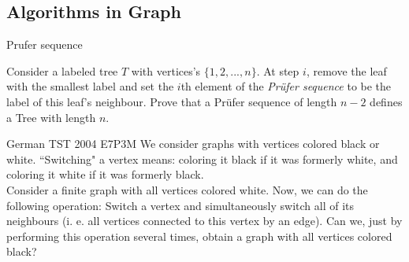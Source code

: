 \newpage
\subsection{Algorithms in Graph}


\begin{minipage}{.5\linewidth}
    \label{definition:cut_graph_theory}
\end{minipage}\hfill%
\begin{minipage}{.49\linewidth}
    \begin{figure}[H]
        \begin{center}
            \hspace{1em}
        \end{center}
    \end{figure}
\end{minipage}



\begin{minipage}{.55\linewidth}
    {Prufer sequence}{
        Consider a labeled tree $ T $ with vertices's $ \{1, 2, ..., n\} $. At
        step $ i $, remove the leaf with the smallest label and set the $ i $th
        element of the \textit{Prüfer sequence} to be the label of this leaf's
        neighbour. Prove that a Prüfer sequence of length $ n-2 $ defines a Tree
        with length $ n $.

    }
\end{minipage}\hfill%
\begin{minipage}{.45\linewidth}
\end{minipage}




{German TST 2004 E7P3}{M}{
    We consider graphs with vertices colored black or white. ``Switching" a
    vertex means: coloring it black if it was formerly white, and coloring it
    white if it was formerly black.\\

    Consider a finite graph with all vertices colored white. Now, we can do the
    following operation: Switch a vertex and simultaneously switch all of its
    neighbours (i. e. all vertices connected to this vertex by an edge). Can we,
    just by performing this operation several times, obtain a graph with all
    vertices colored black?
}\label{problem:induction_type1_30}


